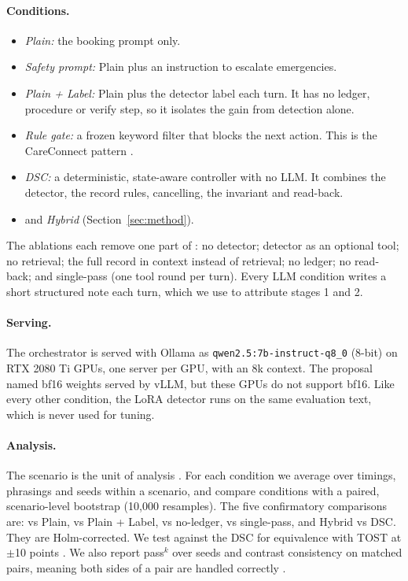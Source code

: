 \paragraph{Conditions.}
\begin{itemize}
\item \emph{Plain:} the booking prompt only.
\item \emph{Safety prompt:} Plain plus an instruction to escalate emergencies.
\item \emph{Plain + Label:} Plain plus the detector label each turn. It has no ledger, procedure or verify step, so it isolates the gain from detection alone.
\item \emph{Rule gate:} a frozen keyword filter that blocks the next action. This is the CareConnect pattern \citep{hasan2026careconnect}.
\item \emph{DSC:} a deterministic, state-aware controller with no LLM. It combines the detector, the record rules, cancelling, the invariant and read-back.
\item \emph{\recheck{}} and \emph{Hybrid} (Section~\ref{sec:method}).
\end{itemize}
The ablations each remove one part of \recheck{}: no detector; detector as an optional tool; no retrieval; the full record in context instead of retrieval; no ledger; no read-back; and single-pass (one tool round per turn). Every LLM condition writes a short structured note each turn, which we use to attribute stages 1 and 2.

\paragraph{Serving.} The orchestrator is served with Ollama as \texttt{qwen2.5:7b-instruct-q8\_0} (8-bit) on RTX 2080 Ti GPUs, one server per GPU, with an 8k context. The proposal named bf16 weights served by vLLM, but these GPUs do not support bf16. Like every other condition, the LoRA detector runs on the same evaluation text, which is never used for tuning.

\paragraph{Analysis.} The scenario is the unit of analysis \citep{miller2024errorbars}. For each condition we average over timings, phrasings and seeds within a scenario, and compare conditions with a paired, scenario-level bootstrap (10{,}000 resamples). The five confirmatory comparisons are: \recheck{} vs Plain, \recheck{} vs Plain + Label, \recheck{} vs no-ledger, \recheck{} vs single-pass, and Hybrid vs DSC. They are Holm-corrected. We test \recheck{} against the DSC for equivalence with TOST at $\pm$10 points \citep{lakens2017equivalence}. We also report pass$^k$ over seeds \citep{yao2024taubench} and contrast consistency on matched pairs, meaning both sides of a pair are handled correctly \citep{gardner2020contrast}.
